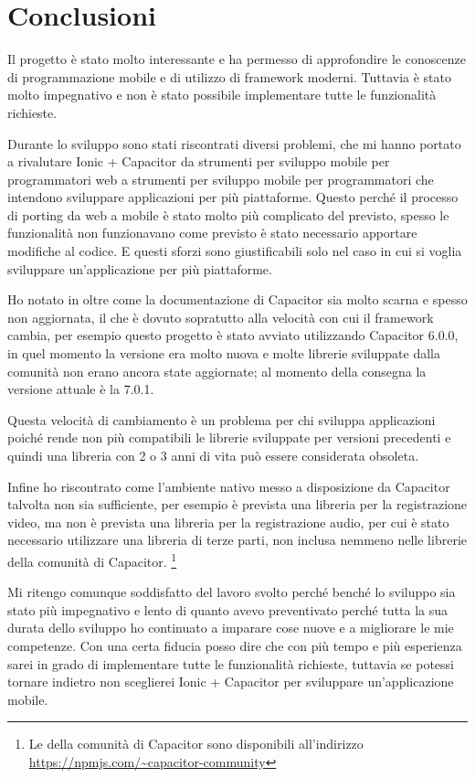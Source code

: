 \documentclass{article}
\begin{document}
\section{Conclusioni}
Il progetto è stato molto interessante e ha permesso di approfondire le conoscenze di programmazione mobile e di utilizzo di framework moderni. Tuttavia è stato molto impegnativo e non è stato possibile implementare tutte le funzionalità richieste.

Durante lo sviluppo sono stati riscontrati diversi problemi, che mi hanno portato a rivalutare Ionic + Capacitor da strumenti per sviluppo mobile per programmatori web a strumenti per sviluppo mobile per programmatori che intendono sviluppare applicazioni per più piattaforme. Questo perché il processo di porting da web a mobile è stato molto più complicato del previsto, spesso le funzionalità non funzionavano come previsto è stato necessario apportare modifiche al codice. E questi sforzi sono giustificabili solo nel caso in cui si voglia sviluppare un'applicazione per più piattaforme.

Ho notato in oltre come la documentazione di Capacitor sia molto scarna e spesso non aggiornata, il che è dovuto sopratutto alla velocità con cui il framework cambia, per esempio questo progetto è stato avviato utilizzando Capacitor 6.0.0, in quel momento la versione era molto nuova e molte librerie sviluppate dalla comunità non erano ancora state aggiornate; al momento della consegna la versione attuale è la 7.0.1.

Questa velocità di cambiamento è un problema per chi sviluppa applicazioni poiché rende non più compatibili le librerie sviluppate per versioni precedenti e quindi una libreria con 2 o 3 anni di vita può essere considerata obsoleta.

Infine ho riscontrato come l'ambiente nativo messo a disposizione da Capacitor talvolta non sia sufficiente, per esempio è prevista una libreria per la registrazione video, ma non è prevista una libreria per la registrazione audio, per cui è stato necessario utilizzare una libreria di terze parti, non inclusa nemmeno nelle librerie della comunità di Capacitor. \footnote{Le della comunità di Capacitor sono disponibili all'indirizzo \url{https://npmjs.com/~capacitor-community}}

Mi ritengo comunque soddisfatto del lavoro svolto perché benché lo sviluppo sia stato più impegnativo e lento di quanto avevo preventivato perché tutta la sua durata dello sviluppo ho continuato a imparare cose nuove e a migliorare le mie competenze. Con una certa fiducia posso dire che con più tempo e più esperienza sarei in grado di implementare tutte le funzionalità richieste, tuttavia se potessi tornare indietro non sceglierei Ionic + Capacitor per sviluppare un'applicazione mobile.
\end{document}
